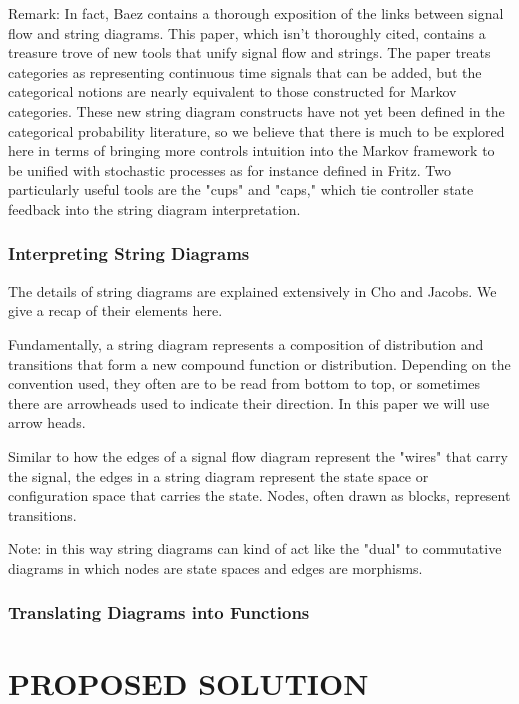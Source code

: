 \documentclass[letterpaper, 10 pt, conference]{ieeeconf}  %
\begin{document}
Remark: In fact, Baez contains a thorough exposition of the links between signal flow and string diagrams.
This paper, which isn't thoroughly cited, contains a treasure trove of new tools that unify signal flow and strings.
The paper treats categories as representing continuous time signals that can be added, but the categorical notions are nearly equivalent to those constructed for Markov categories.
These new string diagram constructs have not yet been defined in the categorical probability literature, so we believe that there is much to be explored here in terms of bringing more controls intuition into the Markov framework to be unified with stochastic processes as for instance defined in Fritz.
Two particularly useful tools are the "cups" and "caps," which tie controller state feedback into the string diagram interpretation.

\subsubsection{Interpreting String Diagrams}

The details of string diagrams are explained extensively in Cho and Jacobs.
We give a recap of their elements here.

Fundamentally, a string diagram represents a composition of distribution and transitions that form a new compound function or distribution.
Depending on the convention used, they often are to be read from bottom to top, or sometimes there are arrowheads used to indicate their direction.
In this paper we will use arrow heads.

Similar to how the edges of a signal flow diagram represent the "wires" that carry the signal, the edges in a string diagram represent the state space or configuration space that carries the state.
Nodes, often drawn as blocks, represent transitions.

Note: in this way string diagrams can kind of act like the "dual" to commutative diagrams in which nodes are state spaces and edges are morphisms.

\subsubsection{Translating Diagrams into Functions}

\section{PROPOSED SOLUTION}
\end{document}
